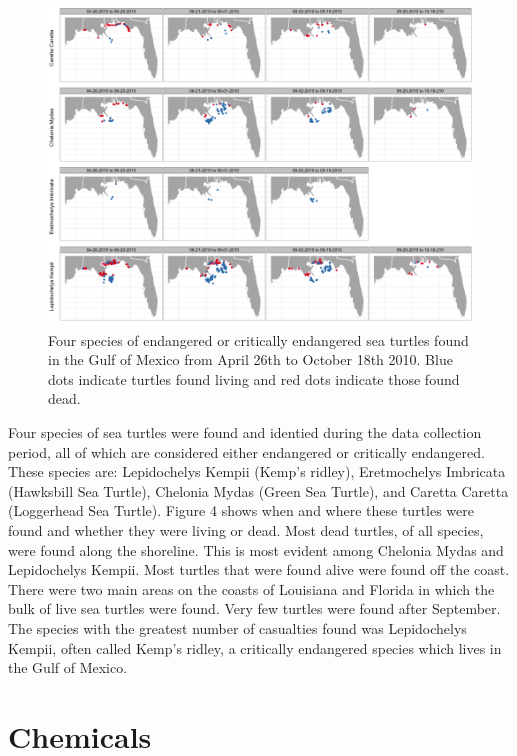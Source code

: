 \documentclass[11pt]{article}
\begin{document}
\begin{figure}[htbp] %
   \centering
   \includegraphics[width=6in]{turtles.png} 
   \caption{Four species of endangered or critically endangered sea turtles found in the Gulf of Mexico from April 26th to October 18th 2010.  Blue dots indicate turtles found living and red dots indicate those found dead.}
   \label{turtles}
\end{figure}

Four species of sea turtles were found and identied during the data collection period, all of which are considered either endangered or critically endangered. These species are: Lepidochelys Kempii (Kemp's ridley), Eretmochelys Imbricata (Hawksbill Sea Turtle), Chelonia Mydas (Green Sea Turtle), and Caretta Caretta (Loggerhead Sea Turtle). Figure 4 shows when and where these turtles were found and whether they were living or dead. Most dead turtles, of all species, were found along the shoreline. This is most evident among Chelonia Mydas and Lepidochelys Kempii. Most turtles that were found alive were found off the coast. There were two main areas on the coasts of Louisiana and Florida in which the bulk of live sea turtles were found. Very few turtles were found after September. The species with the greatest number of casualties found was Lepidochelys Kempii, often called Kemp's ridley, a critically endangered species which lives in the Gulf of Mexico.

\section{Chemicals}
\end{document}
